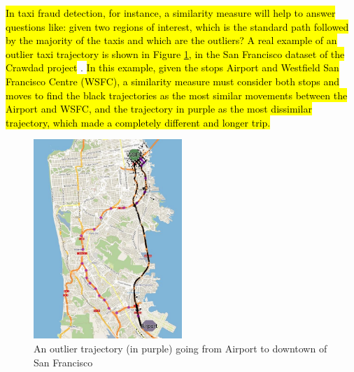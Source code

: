 \documentclass[12pt]{article}
\begin{document}
\hl{In taxi fraud detection, for instance, a similarity measure will help to answer questions like: given two regions of interest, which is the standard path followed by the majority of the taxis and which are the outliers?
A real example of an outlier taxi trajectory is shown in Figure {\ref{fig:crawdad_outlier}}, in the San Francisco dataset of the Crawdad project} \citep{epfl-mobility-20090224}. \hl{In this example, given the stops Airport and  Westfield San Francisco Centre (WSFC), a similarity measure must consider both stops and moves to find the black trajectories as the most similar movements between the Airport and WSFC, and the trajectory in purple as the most dissimilar trajectory, which made a completely different and longer trip.}
 
\begin{figure}[h]
\centering
\includegraphics[width=0.5\textwidth]{Images/CRAWDAD-Outlier.jpg}
\caption{\label{fig:crawdad_outlier} An outlier trajectory (in purple) going from Airport to downtown of San Francisco}
\end{figure}
\end{document}
